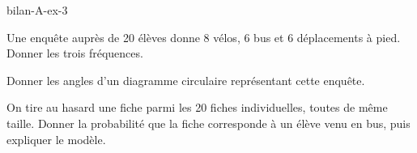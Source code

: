 \begin{blocEdition}{bilan-A-ex-3}
\begin{questions}
\item Une enquête auprès de 20 élèves donne 8 vélos, 6 bus et 6 déplacements à pied. Donner les trois fréquences.
\item Donner les angles d’un diagramme circulaire représentant cette enquête.
\item On tire au hasard une fiche parmi les 20 fiches individuelles, toutes de même taille. Donner la probabilité que la fiche corresponde à un élève venu en bus, puis expliquer le modèle.
\end{questions}\label{fig-bilan-A-ex-3}
\par{}\par\par{}\par{}\par{}\par{}\par{}\par{}
\end{blocEdition}
